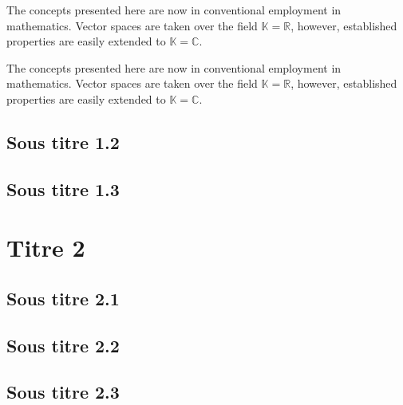\documentclass[10pt,fleqn]{article} %
\begin{document}
\begin{definition}[Titre]
The concepts presented here are now in conventional employment in mathematics. Vector spaces are taken over the field $\mathbb{K}=\mathbb{R}$, however, established properties are easily extended to $\mathbb{K}=\mathbb{C}$.
\end{definition}

\begin{vocabulary}
The concepts presented here are now in conventional employment in mathematics. Vector spaces are taken over the field $\mathbb{K}=\mathbb{R}$, however, established properties are easily extended to $\mathbb{K}=\mathbb{C}$.
\end{vocabulary}

\subsection{Sous titre 1.2}
\lipsum[1-2]
\subsection{Sous titre 1.3}
\lipsum[1-2]
\section{Titre 2}
\subsection{Sous titre 2.1}
\subsection{Sous titre 2.2}
\subsection{Sous titre 2.3}
\end{document}
